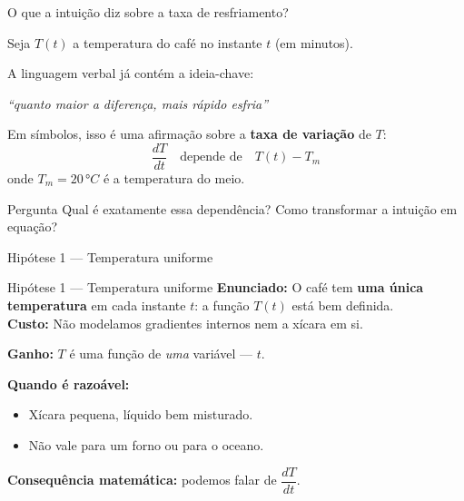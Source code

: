 \documentclass[12pt]{beamer}
\newcommand{\hipotese}[4]{%
  \begin{block}{Hipótese #1 — #2}
    \textbf{Enunciado:} #3\\[4pt]
    \textbf{Custo:} #4
  \end{block}%
}
\begin{document}
\begin{frame}{O que a intuição diz sobre a taxa de resfriamento?}

  Seja $T(t)$ a temperatura do café no instante $t$ (em minutos).

  \vspace{10pt}
  A linguagem verbal já contém a ideia-chave:

  \vspace{8pt}
  \begin{exampleblock}{}
    \centering
    \textit{``quanto maior a diferença, mais rápido esfria''}
  \end{exampleblock}

  \vspace{10pt}
  \pause

  Em símbolos, isso é uma afirmação sobre a \textbf{taxa de variação} de $T$:
  \[
    \frac{dT}{dt} \quad \text{depende de} \quad T(t) - T_m
  \]
  onde $T_m = 20\,°C$ é a temperatura do meio.

  \vspace{10pt}
  \pause

  \begin{alertblock}{Pergunta}
    Qual é exatamente essa dependência?
    \quad Como transformar a intuição em equação?
  \end{alertblock}

\end{frame}


\begin{frame}{Hipótese 1 — Temperatura uniforme}

  \hipotese{1}{Temperatura uniforme}{%
    O café tem \textbf{uma única temperatura} em cada instante $t$:
    a função $T(t)$ está bem definida.%
  }{%
    Não modelamos gradientes internos nem a xícara em si.%
  }

  \vspace{10pt}
  \pause

  \textbf{Ganho:} $T$ é uma função de \emph{uma} variável — $t$.

  \vspace{8pt}
  \textbf{Quando é razoável:}
  \begin{itemize}
    \item Xícara pequena, líquido bem misturado.
    \item Não vale para um forno ou para o oceano.
  \end{itemize}

  \vspace{8pt}
  \textbf{Consequência matemática:} podemos falar de $\dfrac{dT}{dt}$.

\end{frame}
\end{document}
